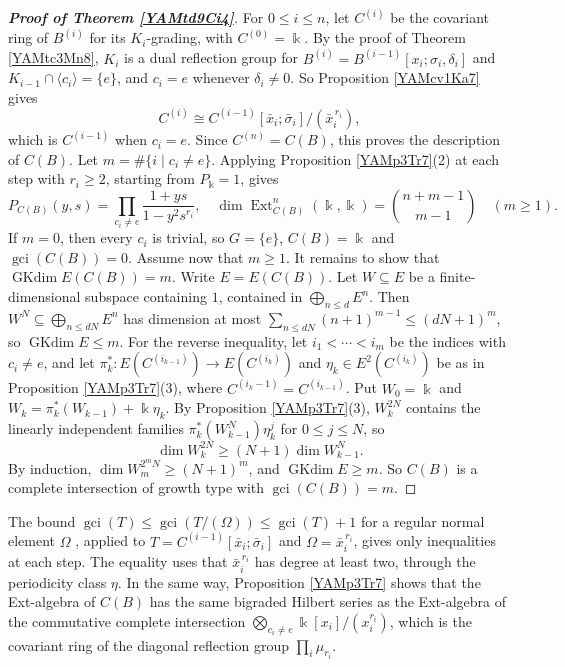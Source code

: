 \documentclass[reqno]{amsart}
\numberwithin{equation}{section}
\theoremstyle{definition}
\theoremstyle{remark}
\theoremstyle{plain}
\newcommand{\kk}{\Bbbk}
\DeclareMathOperator{\Ext}{Ext}
\DeclareMathOperator{\GKdim}{GKdim}
\DeclareMathOperator{\gci}{gci}
\begin{document}
\begin{proof}[\textnormal{\bfseries Proof of Theorem \ref{YAMtd9Ci4}}]
For $0\le i\le n$, let $C^{(i)}$ be the covariant ring of $B^{(i)}$ for its $K_i$-grading, with $C^{(0)}=\kk$. By the proof of Theorem \ref{YAMtc3Mn8}, $K_i$ is a dual reflection group for $B^{(i)}=B^{(i-1)}[x_i;\sigma_i,\delta_i]$ and $K_{i-1}\cap\langle c_i\rangle=\{e\}$, and $c_i=e$ whenever $\delta_i\neq0$. So Proposition \ref{YAMcv1Ka7} gives
\[
C^{(i)}\cong C^{(i-1)}[\bar x_i;\bar\sigma_i]/(\bar x_i^{\,r_i}),
\]
which is $C^{(i-1)}$ when $c_i=e$. Since $C^{(n)}=C(B)$, this proves the description of $C(B)$. Let $m=\#\{i\mid c_i\neq e\}$. Applying Proposition \ref{YAMp3Tr7}(2) at each step with $r_i\ge2$, starting from $P_\kk=1$, gives
\[
P_{C(B)}(y,s)=\prod_{c_i\neq e}\frac{1+ys}{1-y^2s^{r_i}},\quad\dim\Ext^n_{C(B)}(\kk,\kk)=\binom{n+m-1}{m-1}\quad(m\ge1).
\]
If $m=0$, then every $c_i$ is trivial, so $G=\{e\}$, $C(B)=\kk$ and $\gci(C(B))=0$. Assume now that $m\ge1$. It remains to show that $\GKdim E(C(B))=m$. Write $E=E(C(B))$. Let $W\subseteq E$ be a finite-dimensional subspace containing $1$, contained in $\bigoplus_{n\le d}E^n$. Then $W^N\subseteq\bigoplus_{n\le dN}E^n$ has dimension at most $\sum_{n\le dN}(n+1)^{m-1}\le(dN+1)^m$, so $\GKdim E\le m$. For the reverse inequality, let $i_1<\cdots<i_m$ be the indices with $c_i\neq e$, and let $\pi_k^*\colon E(C^{(i_{k-1})})\to E(C^{(i_k)})$ and $\eta_k\in E^2(C^{(i_k)})$ be as in Proposition \ref{YAMp3Tr7}(3), where $C^{(i_k-1)}=C^{(i_{k-1})}$. Put $W_0=\kk$ and $W_k=\pi_k^*(W_{k-1})+\kk\eta_k$. By Proposition \ref{YAMp3Tr7}(3), $W_k^{2N}$ contains the linearly independent families $\pi_k^*(W_{k-1}^N)\eta_k^j$ for $0\le j\le N$, so
\[
\dim W_k^{2N}\ge(N+1)\dim W_{k-1}^N.
\]
By induction, $\dim W_m^{2^mN}\ge(N+1)^m$, and $\GKdim E\ge m$. So $C(B)$ is a complete intersection of growth type with $\gci(C(B))=m$.
\end{proof}

The bound $\gci(T)\le\gci(T/(\Omega))\le\gci(T)+1$ for a regular normal element $\Omega$ \cite[Theorem 1.11(a)]{KKZ2}, applied to $T=C^{(i-1)}[\bar x_i;\bar\sigma_i]$ and $\Omega=\bar x_i^{\,r_i}$, gives only inequalities at each step. The equality uses that $\bar x_i^{\,r_i}$ has degree at least two, through the periodicity class $\eta$. In the same way, Proposition \ref{YAMp3Tr7} shows that the Ext-algebra of $C(B)$ has the same bigraded Hilbert series as the Ext-algebra of the commutative complete intersection $\bigotimes_{c_i\neq e}\kk[x_i]/(x_i^{r_i})$, which is the covariant ring of the diagonal reflection group $\prod_i\mu_{r_i}$.
\end{document}
